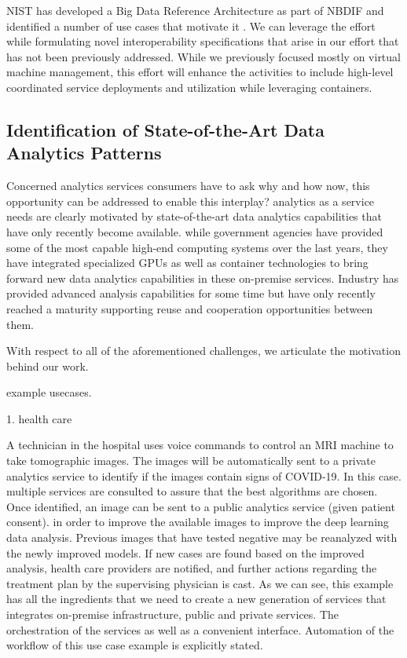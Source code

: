 NIST has developed a Big Data Reference Architecture as part of
NBDIF\cite{nist-v6} and identified a number of use cases that motivate
it \cite{nist-v3}. We can leverage the effort
~\cite{nist-v1,nist-v2,nist-v3,nist-v4,nist-v5,nist-v6,nist-v7,nist-v8,nist-v9}
while formulating novel interoperability specifications that arise in
our effort that has not been previously addressed. While we previously focused
mostly on virtual machine management, this effort will enhance the
activities to include high-level coordinated service deployments and
utilization while leveraging containers.

\subsection{Identification of State-of-the-Art Data Analytics Patterns}

Concerned analytics services consumers have to ask why and how now, 
this opportunity can be addressed to enable this interplay?  
analytics as a service needs are clearly motivated by state-of-the-art data
analytics capabilities that have only recently become available.
while government agencies have provided some of the most capable
high-end computing systems over the last years, they have \NOTE{[tightly?]} integrated
specialized GPUs as well as container technologies to bring forward
new data analytics capabilities in these on-premise services. \NOTE{[commercial]} Industry
has provided advanced analysis capabilities for some time but have only
recently reached a maturity supporting reuse and
cooperation opportunities between them. 

With respect to all of the aforementioned challenges, we articulate 
the motivation behind our work. 

example usecases. 

1. health care

A technician in the hospital uses voice commands to control an MRI
machine to take tomographic images. The images will be automatically
sent to a private analytics service to identify if the images contain
signs of COVID-19. In this case. multiple services are consulted to 
assure that the best  algorithms are chosen. 
Once identified, an image can be sent to a public analytics service (given patient consent).
in
order to improve the available images to improve the deep learning data
analysis. Previous images that have tested negative may be reanalyzed
with the newly improved models. If new cases are found based on
the improved analysis, health care providers are notified, and further
actions regarding the treatment plan by the supervising physician is
cast. As we can see, this example has all the ingredients that we need
to create a new generation of services that integrates on-premise
infrastructure, public and private services. The orchestration of the
services as well as a convenient interface. Automation of the workflow
of this use case example is explicitly stated.

